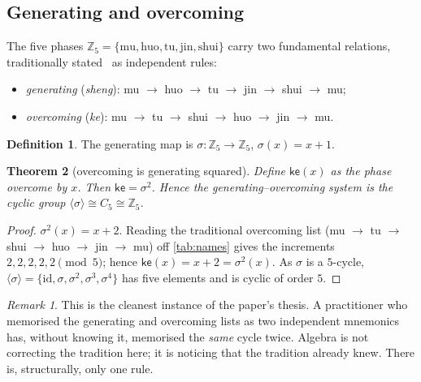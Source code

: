 \documentclass[11pt,a4paper]{article}
\newtheorem{theorem}{Theorem}[section]
\theoremstyle{definition}
\newtheorem{definition}[theorem]{Definition}
\theoremstyle{remark}
\newtheorem*{remark}{Remark}
\newcommand{\Z}{\mathbb{Z}}
\newcommand{\ke}{\mathsf{ke}}
\begin{document}
\subsection{Generating and overcoming}

The five phases $\Z_5=\{\text{mu},\text{huo},\text{tu},\text{jin},\text{shui}\}$ carry two fundamental relations, traditionally stated~\cite{hongfan} as independent rules:
\begin{itemize}[leftmargin=*]
\item \emph{generating} (\emph{sheng}): mu $\to$ huo $\to$ tu $\to$ jin $\to$ shui $\to$ mu;
\item \emph{overcoming} (\emph{ke}): mu $\to$ tu $\to$ shui $\to$ huo $\to$ jin $\to$ mu.
\end{itemize}

\begin{definition}
The generating map is $\sigma:\Z_5\to\Z_5$, $\sigma(x)=x+1$.
\end{definition}

\begin{theorem}[overcoming is generating squared]\label{thm:wuxing}
Define $\ke(x)$ as the phase overcome by $x$. Then $\ke=\sigma^2$. Hence the generating--overcoming system is the cyclic group $\langle\sigma\rangle\cong C_5\cong\Z_5$.
\end{theorem}
\begin{proof}
$\sigma^2(x)=x+2$. Reading the traditional overcoming list (mu $\to$ tu $\to$ shui $\to$ huo $\to$ jin $\to$ mu) off \cref{tab:names} gives the increments $2,2,2,2,2\pmod 5$; hence $\ke(x)=x+2=\sigma^2(x)$. As $\sigma$ is a $5$-cycle, $\langle\sigma\rangle=\{\mathrm{id},\sigma,\sigma^2,\sigma^3,\sigma^4\}$ has five elements and is cyclic of order $5$.
\end{proof}

\begin{remark}
This is the cleanest instance of the paper's thesis. A practitioner who memorised the generating and overcoming lists as two independent mnemonics has, without knowing it, memorised the \emph{same} cycle twice. Algebra is not correcting the tradition here; it is noticing that the tradition already knew. There is, structurally, only one rule.
\end{remark}
\end{document}
